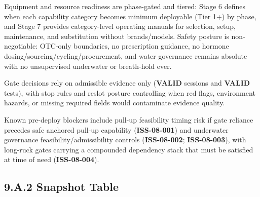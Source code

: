 \documentclass[10pt]{article}
\begin{document}
Equipment and resource readiness are phase-gated and tiered: Stage 6 defines when each capability category becomes minimum deployable (Tier 1+) by phase, and Stage 7 provides category-level operating manuals for selection, setup, maintenance, and substitution without brands/models. Safety posture is non-negotiable: OTC-only boundaries, no prescription guidance, no hormone dosing/sourcing/cycling/procurement, and water governance remains absolute with no unsupervised underwater or breath-hold ever.

Gate decisions rely on admissible evidence only (\textbf{VALID} sessions and \textbf{VALID} tests), with stop rules and reslot posture controlling when red flags, environment hazards, or missing required fields would contaminate evidence quality.

Known pre-deploy blockers include pull-up feasibility timing risk if gate reliance precedes safe anchored pull-up capability (\textbf{ISS-08-001}) and underwater governance feasibility/admissibility controls (\textbf{ISS-08-002}; \textbf{ISS-08-003}), with long-ruck gates carrying a compounded dependency stack that must be satisfied at time of need (\textbf{ISS-08-004}).

\subsection*{9.A.2 Snapshot Table}
{}

\begingroup
\scriptsize
\setlength{\tabcolsep}{2pt}
\renewcommand{\arraystretch}{1.12}
\end{document}
